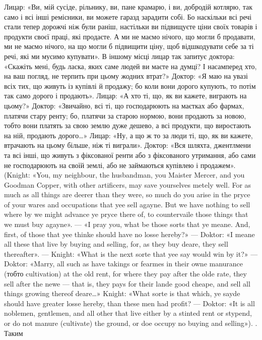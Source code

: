 {Лицар: «Ви, мій сусіде, рільнику, ви, пане крамарю, і ви, добродій
котлярю, так само і всі інші ремісники, ви можете гаразд зарадити
собі. Бо наскільки всі речі стали тепер дорожчі ніж були раніш, настільки
ви підвищуєте ціни своїх товарів і продукти своєї праці, які продаєте.
А ми не маємо нічого, що могли б продавати, ми не маємо нічого, на що
могли б підвищити ціну, щоб відшкодувати себе за ті речі, які ми мусимо
купувати». В іншому місці лицар так запитує доктора: «Скажіть мені,
будь ласка, яких саме людей ви маєте на думці? І насамперед хто, на
ваш погляд, не терпить при цьому жодних втрат?» Доктор: «Я маю на
увазі всіх тих, що живуть із купівлі й продажу; бо коли вони дорого
купують, то потім так само дорого і продають». Лицар: «А хто ті, що,
як ви кажете, виграють на цьому?» Доктор: «Звичайно, всі ті, що господарюють
на маєтках або фармах, платячи стару ренту; бо, платячи за старою
нормою, вони продають за новою, тобто вони платять за свою землю
дуже дешево, а всі продукти, що виростають на ній, продають дорого\dots{}»
Лицар: «Ну, а що ж то за люди ті, що, як ви кажете, втрачають на цьому
більше, ніж ті виграли». Доктор: «Вся шляхта, джентлмени та всі інші,
що живуть з фіксованої ренти або з фіксованого утримання, або сами
не господарюють на своїй землі, або не займаються купівлею і продажем».
(Knight: «You, my neighbour, the husbandman, you Maister Mercer,
and you Goodman Copper, with other artificers, may save yourselves
metely well. For as much as all things are deerer than they were, so much
do you arise in the pryce of your wares and occupations that yee sell agayne.
But we have nothing to sell where by we might advance ye pryce there of,
to countervaile those things that we must buy agayne». — «I pray you, what
be those sorts that ye meane. And, first, of those that yee thinke should
have no losse hereby?» — Doktor: «I meane all these that live by buying
and selling, for, as they buy deare, they sell thereafter». — Knight: «What
is the next sorte that yee say would win by it?» — Doktor: «Marry, all
such as have takings or fearmes in their owne manurance (тобто cultivation)
at the old rent, for where they pay after the olde rate, they sell after the newe — that is, they pays for their lande good cheape, and sell all things
growing thereof deare\dots{}» Knight: «What sorte is that which, ye sayde
should have greater losse hereby, than these men had profit? — Doktor:
«It is all noblemen, gentlemen, and all other that live either by a stinted
rent or stypend, or do not manure (cultivate) the ground, or doe occupy no
buying and selling»).
}. Таким
